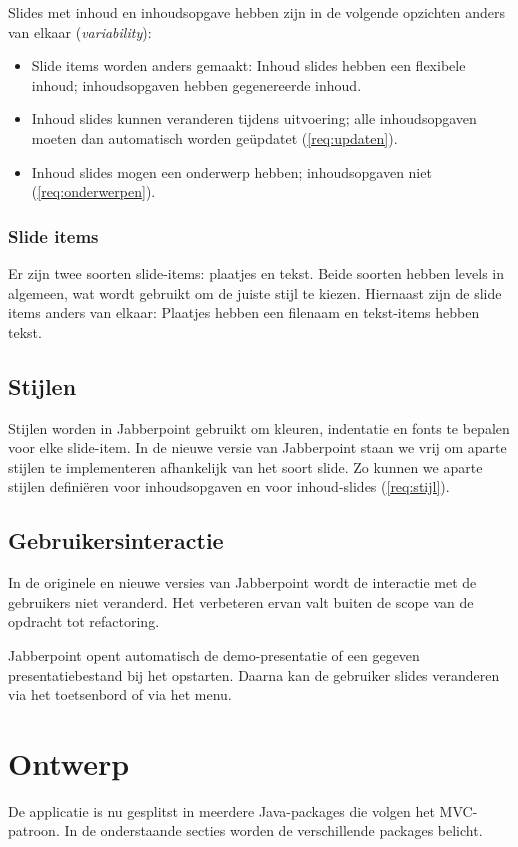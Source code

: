 \documentclass[a4paper]{article}
\newcommand{\reqref}[1]{\ref{req:#1}}
\begin{document}
			Slides met inhoud en inhoudsopgave hebben zijn in de volgende opzichten anders van elkaar (\textit{variability}):
			\begin{itemize}
				\item Slide items worden anders gemaakt: Inhoud slides hebben een flexibele inhoud; inhoudsopgaven hebben gegenereerde inhoud.
				\item Inhoud slides kunnen veranderen tijdens uitvoering; alle inhoudsopgaven moeten dan automatisch worden geüpdatet (\reqref{updaten}).
				\item Inhoud slides mogen een onderwerp hebben; inhoudsopgaven niet  (\reqref{onderwerpen}).
			\end{itemize}

		\subsubsection{Slide items}
			Er zijn twee soorten slide-items: plaatjes en tekst.
			Beide soorten hebben levels in algemeen, wat wordt gebruikt om de juiste stijl te kiezen.
			Hiernaast zijn de slide items anders van elkaar: Plaatjes hebben een filenaam en tekst-items hebben tekst.

		\subsection{Stijlen}
			Stijlen worden in Jabberpoint gebruikt om kleuren, indentatie en fonts te bepalen voor elke slide-item.
			In de nieuwe versie van Jabberpoint staan we vrij om aparte stijlen te implementeren afhankelijk van het soort slide.
			Zo kunnen we aparte stijlen definiëren voor inhoudsopgaven en voor inhoud-slides (\reqref{stijl}).

	\subsection{Gebruikersinteractie}\label{sec:control-analyse}
		In de originele en nieuwe versies van Jabberpoint wordt de interactie met de gebruikers niet veranderd.
		Het verbeteren ervan valt buiten de scope van de opdracht tot refactoring.

		Jabberpoint opent automatisch de demo-presentatie of een gegeven presentatiebestand bij het opstarten.
		Daarna kan de gebruiker slides veranderen via het toetsenbord of via het menu.

\pagebreak
\section{Ontwerp}\label{sec:ontwerp}
	De applicatie is nu gesplitst in meerdere Java-packages die volgen het MVC-patroon.
	In de onderstaande secties worden de verschillende packages belicht.
\end{document}
